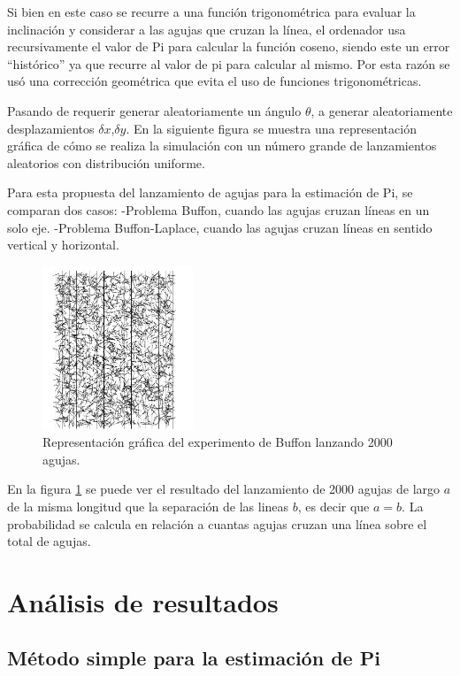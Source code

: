 \documentclass{rbf}
\begin{document}
Si bien en este caso se recurre a una función trigonométrica para evaluar la inclinación y considerar a las agujas que cruzan la línea, el ordenador usa recursivamente el valor de Pi para calcular la función coseno, siendo este un error “histórico” ya que recurre al valor de pi para calcular al mismo. Por esta razón se usó una corrección geométrica que evita el uso de funciones trigonométricas.

Pasando de requerir generar aleatoriamente un ángulo $\theta$, a generar aleatoriamente desplazamientos $\delta x$,$\delta y$. En la siguiente figura se muestra una representación gráfica de cómo se realiza la simulación con un número grande de lanzamientos aleatorios con distribución uniforme. \cite{Statistics}

Para esta propuesta del lanzamiento de agujas para la estimación de Pi, se comparan dos casos:
-Problema Buffon, cuando las agujas cruzan líneas en un solo eje.
-Problema Buffon-Laplace, cuando las agujas cruzan líneas en sentido vertical y horizontal.

\begin{figure}[tbp!]
 \centering
  \includegraphics[width=0.4\textwidth]{figures/buffon.jpg}
	\caption{Representación gráfica del experimento de Buffon lanzando 2000 agujas.\cite{Statistics}}
 \label{buff}
\end{figure}


En la figura \ref{buff} se puede ver el resultado del lanzamiento de 2000 agujas de largo $a$ de la misma longitud que la separación de las lineas $b$, es decir que $a=b$. La probabilidad se calcula en relación a cuantas agujas cruzan una línea sobre el total de agujas. 

\section{Análisis de resultados}
\subsection{Método simple para la estimación de Pi}
\end{document}
